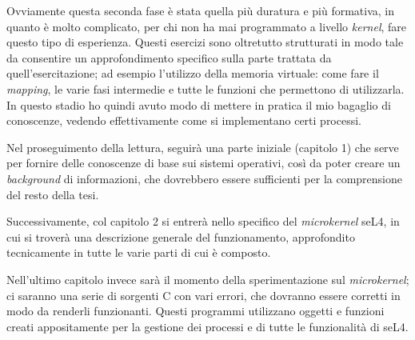 Ovviamente questa seconda fase è stata quella più duratura e più formativa, in quanto è molto complicato, per chi non ha mai programmato a livello \textit{kernel}, fare questo tipo di esperienza. Questi esercizi sono oltretutto strutturati in modo tale da consentire un approfondimento specifico sulla parte trattata da quell'esercitazione; ad esempio l'utilizzo della memoria virtuale: come fare il \textit{mapping}, le varie fasi intermedie e tutte le funzioni che permettono di utilizzarla. In questo stadio ho quindi avuto modo di mettere in pratica il mio bagaglio di conoscenze, vedendo effettivamente come si implementano certi processi.
\newline

Nel proseguimento della lettura, seguirà una parte iniziale (capitolo 1) che serve per fornire delle conoscenze di base sui sistemi operativi, così da poter creare un \textit{background} di informazioni, che dovrebbero essere sufficienti per la comprensione del resto della tesi. 

Successivamente, col capitolo 2 si entrerà nello specifico del \textit{microkernel} seL4, in cui si troverà una descrizione generale del funzionamento, approfondito tecnicamente in tutte le varie parti di cui è composto.

Nell'ultimo capitolo invece sarà il momento della sperimentazione sul \textit{microkernel}; ci saranno una serie di sorgenti C con vari errori, che dovranno essere corretti in modo da renderli funzionanti. Questi programmi utilizzano oggetti e funzioni creati appositamente per la gestione dei processi e di tutte le funzionalità di seL4. 
